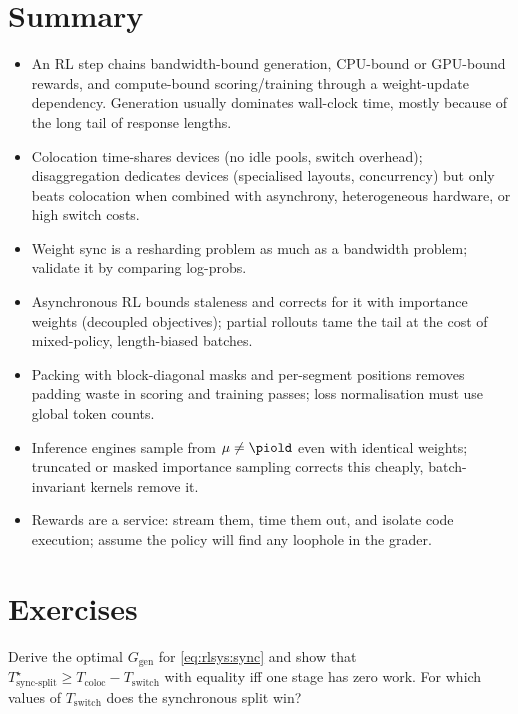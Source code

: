 \section{Summary}\label{sec:rlsys:summary}
\begin{itemize}
\item An RL step chains bandwidth-bound generation, CPU-bound or GPU-bound rewards, and
compute-bound scoring/training through a weight-update dependency. Generation usually
dominates wall-clock time, mostly because of the long tail of response lengths.
\item Colocation time-shares devices (no idle pools, switch overhead); disaggregation
dedicates devices (specialised layouts, concurrency) but only beats colocation when combined
with asynchrony, heterogeneous hardware, or high switch costs.
\item Weight sync is a resharding problem as much as a bandwidth problem; validate it by
comparing log-probs.
\item Asynchronous RL bounds staleness and corrects for it with importance weights (decoupled
objectives); partial rollouts tame the tail at the cost of mixed-policy, length-biased batches.
\item Packing with block-diagonal masks and per-segment positions removes padding waste in
scoring and training passes; loss normalisation must use global token counts.
\item Inference engines sample from $\mu\neq\piold$ even with identical weights; truncated or
masked importance sampling corrects this cheaply, batch-invariant kernels remove it.
\item Rewards are a service: stream them, time them out, and isolate code execution; assume the
policy will find any loophole in the grader.
\end{itemize}

\section{Exercises}\label{sec:rlsys:exercises}

\begin{exercise}
Derive the optimal $G_{\text{gen}}$ for \cref{eq:rlsys:sync} and show that
$T^\star_{\text{sync-split}} \ge T_{\text{coloc}} - T_{\text{switch}}$ with equality iff one stage
has zero work. For which values of $T_{\text{switch}}$ does the synchronous split win?
\end{exercise}

